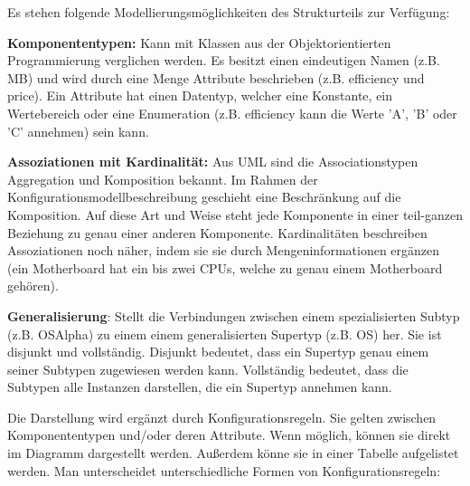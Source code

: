 \documentclass[12pt,a4paper,bibliography=totocnumbered,listof=totoc]{scrartcl}
\begin{document}
Es stehen folgende Modellierungsmöglichkeiten des Strukturteils zur Verfügung:
\begin{compactitem}
\item \textbf{Komponententypen:} Kann mit Klassen aus der Objektorientierten Programmierung verglichen werden. Es besitzt einen eindeutigen Namen (z.B. MB) und wird durch eine Menge Attribute beschrieben (z.B. efficiency und price). Ein Attribute hat einen Datentyp, welcher eine Konstante, ein Wertebereich oder eine Enumeration (z.B. efficiency kann die Werte 'A', 'B' oder 'C' annehmen) sein kann.
\item \textbf{Assoziationen mit Kardinalität:} Aus UML sind die Associationstypen Aggregation und Komposition bekannt. Im Rahmen der Konfigurationsmodellbeschreibung geschieht eine Beschränkung auf die Komposition. Auf diese Art und Weise steht jede Komponente in einer teil-ganzen Beziehung zu genau einer anderen Komponente. Kardinalitäten beschreiben Assoziationen noch näher, indem sie sie durch Mengeninformationen ergänzen (ein Motherboard hat ein bis zwei CPUs, welche zu genau einem Motherboard gehören).
\item \textbf{Generalisierung}: Stellt die Verbindungen zwischen einem spezialisierten Subtyp (z.B. OSAlpha) zu einem einem generalisierten Supertyp (z.B. OS) her. Sie ist disjunkt und vollständig. Disjunkt bedeutet, dass ein Supertyp genau einem seiner Subtypen zugewiesen werden kann. Vollständig bedeutet, dass die Subtypen alle Instanzen darstellen, die ein Supertyp annehmen kann.
\end{compactitem}

Die Darstellung wird ergänzt durch Konfigurationsregeln. Sie gelten zwischen Komponententypen und/oder deren Attribute. Wenn möglich, können sie direkt im Diagramm dargestellt werden. Außerdem könne sie in einer Tabelle aufgelistet werden. Man unterscheidet unterschiedliche Formen von Konfigurationsregeln:
\end{document}
